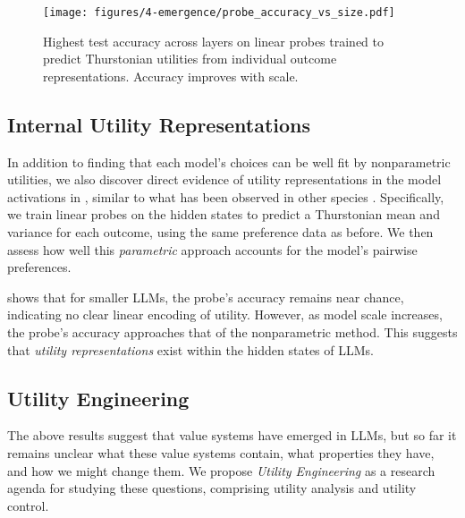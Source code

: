 \begin{wrapfigure}{r}{0.5\textwidth}
    \centering
    \vspace{-10pt}
    \texttt{[image: figures/4-emergence/probe\_accuracy\_vs\_size.pdf]}
    \vspace{-10pt}
    \caption{Highest test accuracy across layers on linear probes trained to predict Thurstonian utilities from individual outcome representations. Accuracy improves with scale.}
    \label{fig:rep_reading_bar_chart}
    \vspace{-10pt}
\end{wrapfigure}

\subsection{Internal Utility Representations}
In addition to finding that each model’s choices can be well fit by nonparametric utilities, we also discover direct evidence of utility representations in the model activations in , similar to what has been observed in other species \citep{Stauffer2014-mf}. Specifically, we train linear probes \citep{alain2018understandingintermediatelayersusing} on the hidden states to predict a Thurstonian mean and variance for each outcome, using the same preference data as before. We then assess how well this \emph{parametric} approach accounts for the model’s pairwise preferences.

 shows that for smaller LLMs, the probe’s accuracy remains near chance, indicating no clear linear encoding of utility. However, as model scale increases, the probe’s accuracy approaches that of the nonparametric method. This suggests that \emph{utility representations} exist within the hidden states of LLMs.



\subsection{Utility Engineering}
The above results suggest that value systems have emerged in LLMs, but so far it remains unclear what these value systems contain, what properties they have, and how we might change them. We propose \textit{Utility Engineering} as a research agenda for studying these questions, comprising utility analysis and utility control.


















